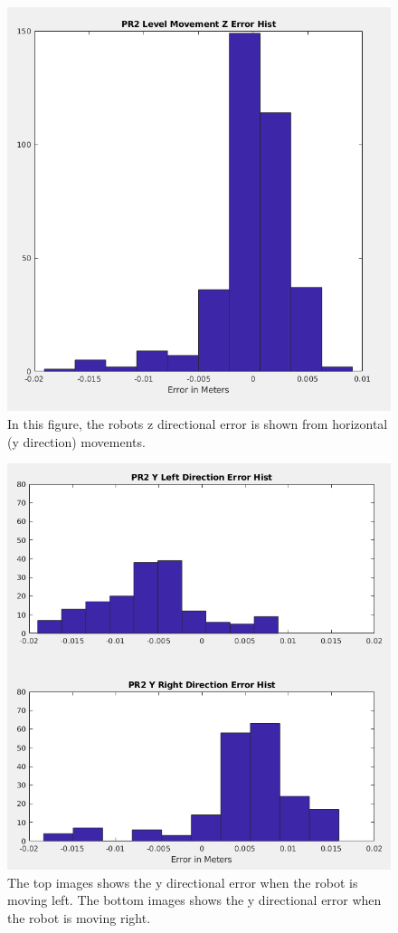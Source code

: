 \documentclass[12pt]{report}
\begin{document}
\begin{figure}[!ht]
	\centering
	\includegraphics[scale=0.35]{pr2_z_error.png}
	\caption{In this figure, the robots z directional error is shown from horizontal (y direction) movements.}
	\label{fig:pr2_z}
\end{figure}

\begin{figure}[!ht]
	\centering
	\includegraphics[scale=0.35]{pr2_y_error.png}
	\caption{The top images shows the y directional error when the robot is moving left. The bottom images shows the y directional error when the robot is moving right.}
	\label{fig:pr2_y}
\end{figure}
\end{document}

